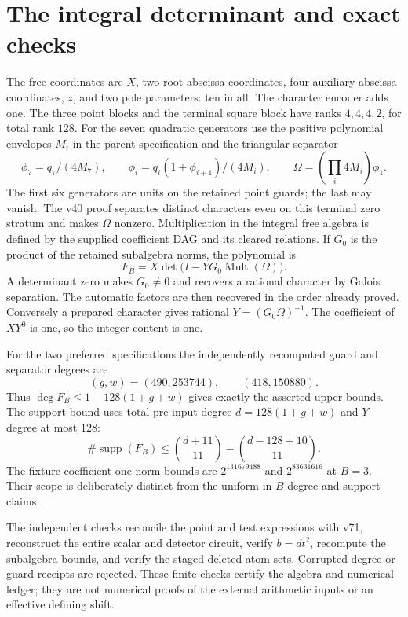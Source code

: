 \documentclass[11pt,a4paper]{article}
\begin{document}
\section{The integral determinant and exact checks}
The free coordinates are $X$, two root abscissa coordinates, four
auxiliary abscissa coordinates, $z$, and two pole parameters: ten in
all. The character encoder adds one. The three point blocks and the
terminal square block have ranks $4,4,4,2$, for total rank $128$.
For the seven quadratic generators use the positive polynomial envelopes
$M_i$ in the parent specification and the triangular separator
\[
 \phi_7=q_7/(4M_7),\qquad
 \phi_i=q_i(1+\phi_{i+1})/(4M_i),\qquad
 \Omega=\left(\prod_i4M_i\right)\phi_1.
\]
The first six generators are units on the retained point guards; the
last may vanish. The v40 proof separates distinct characters even on
this terminal zero stratum and makes $\Omega$ nonzero. Multiplication
in the integral free algebra is defined by the supplied coefficient
DAG and its cleared relations. If $G_0$ is the product of the retained
subalgebra norms, the polynomial is
\[
                 F_B=X\det\bigl(I-YG_0\operatorname{Mult}(\Omega)\bigr).
\]
A determinant zero makes $G_0\ne0$ and recovers a rational character by
Galois separation. The automatic factors are then recovered in the
order already proved. Conversely a prepared character gives rational
$Y=(G_0\Omega)^{-1}$. The coefficient of $X Y^0$ is one, so the integer
content is one.

For the two preferred specifications the independently recomputed guard
and separator degrees are
\[
 (g,w)=(490,253744),\qquad (418,150880).
\]
Thus $\deg F_B\le1+128(1+g+w)$ gives exactly the asserted upper bounds.
The support bound uses total pre-input degree $d=128(1+g+w)$ and
$Y$-degree at most $128$:
\[
 \#\operatorname{supp}(F_B)\le
 \binom{d+11}{11}-\binom{d-128+10}{11}.
\]
The fixture coefficient one-norm bounds are $2^{131679488}$ and
$2^{83631616}$ at $B=3$. Their scope is deliberately distinct from the
uniform-in-$B$ degree and support claims.

The independent checks reconcile the point and test expressions with
v71, reconstruct the entire scalar and detector circuit, verify
$b=dt^2$, recompute the subalgebra bounds, and verify the staged deleted
atom sets. Corrupted degree or guard receipts are rejected. These finite
checks certify the algebra and numerical ledger; they are not numerical
proofs of the external arithmetic inputs or an effective defining shift.
\end{document}
